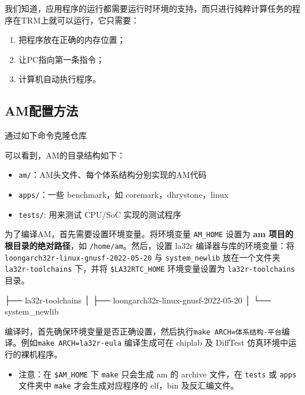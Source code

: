 我们知道，应用程序的运行都需要运行时环境的支持，而只进行纯粹计算任务的程序在TRM上就可以运行，它只需要：

\begin{enumerate}
\def\labelenumi{\arabic{enumi}.}
\item
  把程序放在正确的内存位置；
\item
  让PC指向第一条指令；
\item
  计算机自动执行程序。
\end{enumerate}

\subsection{AM配置方法}\label{sec:06-agility-004}

通过如下命令克隆仓库


可以看到，AM的目录结构如下：

\begin{itemize}
\tightlist
\item
  \texttt{am/}：AM头文件、每个体系结构分别实现的AM代码
\item
  \texttt{apps/}：一些 benchmark，如 coremark，dhrystone，linux
\item
  \texttt{tests/}: 用来测试 CPU/SoC 实现的测试程序
\end{itemize}

为了编译AM，首先需要设置环境变量。将环境变量 \texttt{AM\_HOME} 设置为 \textbf{am 项目的根目录的绝对路径}，如 \texttt{/home/am}。然后，设置 la32r 编译器与库的环境变量：将 \texttt{loongarch32r-linux-gnusf-2022-05-20} 与 \texttt{system\_newlib} 放在一个文件夹 \texttt{la32r-toolchains} 下，并将 \texttt{\$LA32RTC\_HOME} 环境变量设置为 \texttt{la32r-toolchains} 目录。

\begin{CodeBlock}[language=BookText]
├── la32r-toolchains
│   ├── loongarch32r-linux-gnusf-2022-05-20
│   └── system_newlib
\end{CodeBlock}

编译时，首先确保环境变量是否正确设置，然后执行\texttt{make\ ARCH=体系结构-平台}编译。例如\texttt{make\ ARCH=la32r-eula} 编译生成可在 chiplab 及 DiffTest 仿真环境中运行的裸机程序。

\begin{itemize}
\tightlist
\item
  注意：在 \texttt{\$AM\_HOME} 下 \texttt{make} 只会生成 am 的 archive 文件，在 \texttt{tests} 或 \texttt{apps} 文件夹中 \texttt{make} 才会生成对应程序的 elf，bin 及反汇编文件。
\end{itemize}

